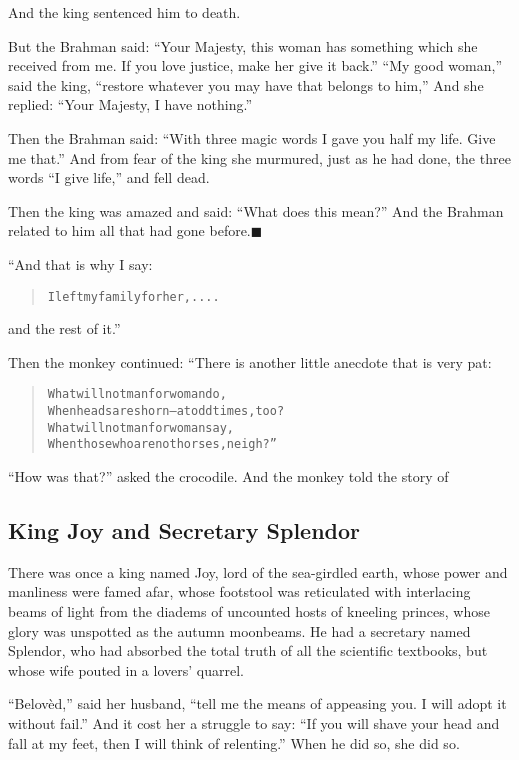 \documentclass[article, twoside, 14pt]{memoir}
\newcommand{\qed}{\hfill \ensuremath{\blacksquare}}
\renewenvironment{verbatim}{%
\begin{quote}%
\vskip -10pt%
\begin{alltt}\normalfont\large}{\end{alltt}%
\end{quote}%
\vskip -10pt
} %
\begin{document}
And the king sentenced him to death.

But the Brahman said:
``Your Majesty, this woman has something which she received from me. If you love justice, make her give it back.''
``My good woman,'' said the king,
``restore whatever you may have that belongs to him,'' And she
replied: ``Your Majesty, I have nothing.''

Then the Brahman said:
``With three magic words I gave you half my life. Give me that.''
And from fear of the king she murmured, just as he had done, the
three words ``I give life,'' and fell dead.

Then the king was amazed and said: ``What does this mean?'' And the
Brahman related to him all that had gone
before.\hyperref[s71]{\qed}

“And that is why I say:

\begin{verbatim}
I left my family for her, ....
\end{verbatim}
and the rest of it.”

Then the monkey continued: “There is another little anecdote that
is very pat:

\begin{verbatim}
What will not man for woman do,
When heads are shorn--at odd times, too?
What will not man for woman say,
When those who are not horses, neigh?”
\end{verbatim}
``How was that?'' asked the crocodile. And the monkey told the
story of

\subsection{King Joy and Secretary Splendor}

\label{s72}

There was once a king named Joy, lord of the sea-girdled earth,
whose power and manliness were famed afar, whose footstool was
reticulated with interlacing beams of light from the diadems of
uncounted hosts of kneeling princes, whose glory was unspotted as
the autumn moonbeams. He had a secretary named Splendor, who had
absorbed the total truth of all the scientific textbooks, but whose
wife pouted in a lovers' quarrel.

``Belovèd,'' said her husband,
``tell me the means of appeasing you. I will adopt it without fail.''
And it cost her a struggle to say:
``If you will shave your head and fall at my feet, then I will think of relenting.''
When he did so, she did so.
\end{document}
